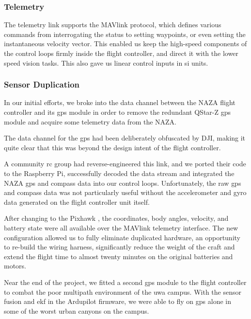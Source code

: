 \documentclass[a4paper, 11pt, titlepage]{article}
\begin{document}
    \subsubsection{Telemetry}
      The telemetry link supports the MAVlink \cite{MAVLink} protocol, which defines various commands from interrogating the status to setting waypoints, or even setting the instantaneous velocity vector.
      This enabled us keep the high-speed components of the control loops firmly inside the flight controller, and direct it with the lower speed vision tasks.  This also gave us linear control inputs in \gls{si} units.

    \subsubsection{Sensor Duplication}
      In our initial efforts, we broke into the data channel between the NAZA flight controller and its \gls{gps} module in order to remove the redundant QStar-Z \gls{gps} module and acquire some telemetry data from the NAZA.

      The data channel for the \gls{gps} had been deliberately obfuscated by DJI, making it quite clear that this was beyond the design intent of the flight controller.
      
      A community \gls{rc} group had reverse-engineered this link, and we ported their code to the Raspberry Pi, successfully decoded the data stream and integrated the NAZA \gls{gps} and compass data into our control loops.
      Unfortunately, the raw \gls{gps} and compass data was not particularly useful without the accelerometer and gyro data generated on the flight controller unit itself.

      After changing to the Pixhawk \cite{3dr-pixhawk}, the coordinates, body angles, velocity, and battery state were all available over the MAVlink \cite{MAVLink} telemetry interface.
      The new configuration allowed us to fully eliminate duplicated hardware, an opportunity to re-build the wiring harness, significantly reduce the weight of the craft and extend the flight time to almost twenty minutes on the original batteries and motors.

      Near the end of the project, we fitted a second \gls{gps} module to the flight controller to combat the poor multipath environment of the \gls{uwa} campus.  With the sensor fusion and \gls{ekf} in the Ardupilot firmware, we were able to fly on \gls{gps} alone in some of the worst urban canyons on the campus.
\end{document}

